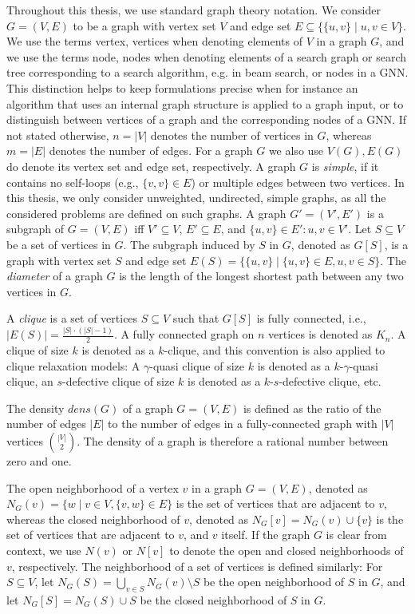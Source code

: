 \documentclass[draft,final]{vutinfth} %
\begin{document}
Throughout this thesis, we use standard graph theory notation. 
We consider $G = (V, E)$ to be a graph with vertex set $V$ and edge set $E \subseteq \{\{u,v\} \mid u,v \in V\}$. We use the terms vertex, vertices when denoting elements of $V$ in a graph $G$, and we use the terms node, nodes when denoting elements of a search graph or search tree corresponding to a search algorithm, e.g. in beam search, or nodes in a GNN. This distinction helps to keep formulations precise when for instance an algorithm that uses an internal graph structure is applied to a graph input, or to distinguish between vertices of a graph and the corresponding nodes of a GNN. 
If not stated otherwise, $n = |V|$ denotes the number of vertices in $G$, whereas $m = |E|$ denotes the number of edges. 
For a graph $G$ we also use $V(G), E(G)$ do denote its vertex set and edge set, respectively. 
A graph $G$ is \emph{simple}, if it contains no self-loops (e.g.,  $\{v,v\} \in E$) or multiple edges between two vertices. In this thesis, we only consider unweighted, undirected, simple graphs, as all the considered problems are defined on such graphs. 
A graph $G' = (V', E')$ is a subgraph of $G = (V,E)$ iff $V' \subseteq V$, $E' \subseteq E$, and $\{u,v\} \in E' \colon u,v \in V'$. Let $S \subseteq V$ be a set of vertices in $G$. The subgraph induced by $S$ in $G$, denoted as $G[S]$, is a graph with vertex set $S$ and edge set $E(S) = \{ \{u,v\} \mid \{u,v\} \in E, u,v \in S \}$. 
The \emph{diameter} of a graph $G$ is the length of the longest shortest path between any two vertices in $G$. 

A \emph{clique} is a set of vertices $S \subseteq V$ such that $G[S]$ is fully connected, i.e., $|E(S)| = \frac{|S| \cdot (|S|-1)}{2}$. A fully connected graph on $n$ vertices is denoted as $K_n$. A clique of size $k$ is denoted as a $k$-clique, and this convention is also applied to clique relaxation models: A $\gamma$-quasi clique of size $k$ is denoted as a $k$-$\gamma$-quasi clique, an $s$-defective clique of size $k$ is denoted as a $k$-$s$-defective clique, etc. 

The density $\mathit{dens}(G)$ of a graph $G = (V,E)$ is defined as the ratio of the number of edges $|E|$ to the number of edges in a fully-connected graph with $|V|$ vertices $\binom{|V|}{2}$. 
The density of a graph is therefore a rational number between zero and one. 

The open neighborhood of a vertex $v$ in a graph $G = (V,E)$, denoted as $N_G(v) = \{ w \mid v \in V, \{v,w\} \in E\}$ is the set of vertices that are adjacent to $v$, whereas the closed neighborhood of $v$, denoted as $N_G[v] = N_G(v) \cup \{v\}$ is the set of vertices that are adjacent to $v$, and $v$ itself. 
If the graph $G$ is clear from context, we use $N(v)$ or $N[v]$ to denote the open and closed neighborhoods of $v$, respectively. 
The neighborhood of a set of vertices is defined similarly: For $S \subseteq V$, let $N_G(S) = \bigcup_{v \in S} N_G(v) \setminus S$ be the open neighborhood of $S$ in $G$, and let $N_G[S] = N_G(S) \cup S$ be the closed neighborhood of $S$ in $G$. 
\end{document}
